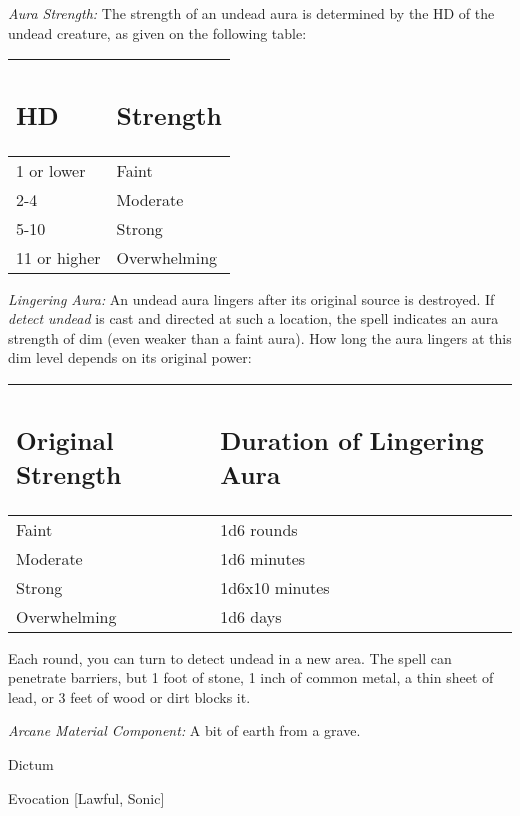 \documentclass{article}
\begin{document}
\textit{Aura Strength: }The strength of an undead aura is determined by the HD 
of the undead creature, as given on the following table:

\begin{tabular}{|>{\raggedright}p{47pt}|>{\raggedright}p{58pt}|}
\hline
\subsection*{H\textbf{D}} & \subsection*{S\textbf{trength}}\tabularnewline
\hline
1 or lower & Faint\tabularnewline
\hline
2-4 & Moderate\tabularnewline
\hline
5-10 & Strong\tabularnewline
\hline
11 or higher & Overwhelming\tabularnewline
\hline
\end{tabular}

\textit{Lingering Aura: }An undead aura lingers after its original source is destroyed. 
If \textit{detect undead }is cast and directed at such a location, the spell indicates 
an aura strength of dim (even weaker than a faint aura). How long the aura lingers 
at this dim level depends on its original power:

\begin{tabular}{|>{\raggedright}p{74pt}|>{\raggedright}p{118pt}|}
\hline
\subsection*{O\textbf{riginal Strength}} & \subsection*{D\textbf{uration of Lingering 
Aura}}\tabularnewline
\hline
Faint & 1d6 rounds\tabularnewline
\hline
Moderate & 1d6 minutes\tabularnewline
\hline
Strong & 1d6x10 minutes\tabularnewline
\hline
Overwhelming & 1d6 days\tabularnewline
\hline
\end{tabular}

Each round, you can turn to detect undead in a new area. The spell can penetrate 
barriers, but 1 foot of stone, 1 inch of common metal, a thin sheet of lead, or 
3 feet of wood or dirt blocks it.

\textit{Arcane Material Component: }A bit of earth from a grave.

\vspace{12pt}
Dictum

Evocation [Lawful, Sonic]
\end{document}
